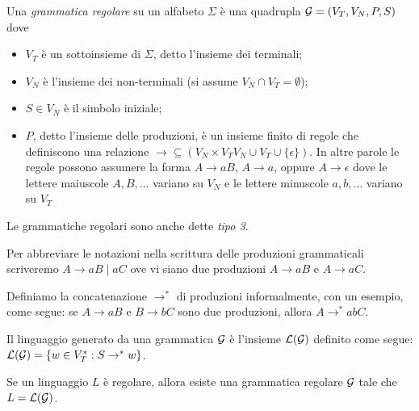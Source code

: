 \documentclass[runningheads,a4paper]{llncs}
\begin{document}
\begin{definition}\label{def:reg-gramm}
Una \emph{grammatica regolare} su un alfabeto $\Sigma$ \`{e} una quadrupla $\mathcal{G} = (V_T,V_N,P,S)$ dove
\begin{itemize}
\item $V_T$ \`{e} un sottoinsieme di $\Sigma$, detto l'insieme dei terminali;
\item $V_N$ \`{e} l'insieme dei non-terminali (si assume $V_N \cap V_T = \emptyset$);
\item $S \in V_N$ \`{e} il simbolo iniziale;
\item $P$, detto l'insieme delle produzioni, \`{e} un insieme finito di regole che definiscono una relazione $\to \subseteq (V_N \times V_TV_N \cup V_T \cup \{\epsilon\})$. In altre parole le regole possono assumere la forma $A \to aB$, $A \to a$, oppure $A \to \epsilon$ dove le lettere maiuscole $A,B,\ldots$ variano su $V_N$ e le lettere minuscole $a,b,\ldots$ variano su $V_T$
\end{itemize}
\end{definition}

Le grammatiche regolari sono anche dette \emph{tipo 3}.

Per abbreviare le notazioni nella scrittura delle produzioni grammaticali scriveremo $A \to aB \mid aC$ ove vi siano due produzioni $A \to aB$ e $A \to aC$.

Definiamo la concatenazione $\to^*$ di produzioni informalmente, con un esempio, come segue: se $A \to aB$ e $B \to bC$ sono due produzioni, allora $A \to^* abC$.

\begin{definition}\label{def:ling-reg-gramm}
Il linguaggio generato da una grammatica $\mathcal{G}$ \`{e} l'insieme $\mathcal{L}(\mathcal{G})$ definito come segue:\\ $\mathcal{L}(\mathcal{G}) = \{w \in V_T^* : S \to^* w\}$.
\end{definition}

\begin{theorem}\label{thm:ling-reg-gramm1}
Se un linguaggio $L$ \`{e} regolare, allora esiste una grammatica regolare $\mathcal{G}$ tale che $L = \mathcal{L}(\mathcal{G})$.
\end{theorem}
\end{document}
